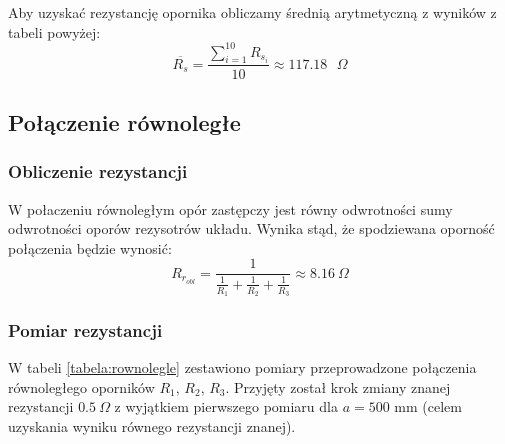 \documentclass[a4paper,12pts]{article}
\begin{document}
\begin{table}[!h]
	\centering
	\caption{Wyniki pomiarów dla połączenia szeregowego}
	\label{tabela:szeregowe}
\end{table}

Aby uzyskać rezystancję opornika obliczamy średnią arytmetyczną z wyników z tabeli powyżej:
\begin{equation}
\overline{R_{s}} = \frac{\sum_{i = 1}^{10} R_{{s}_i}}{10} \approx 117.18 \textrm{ $\Omega$}
\end{equation}


\subsection{Połączenie równoległe}
\subsubsection{Obliczenie rezystancji}
W połaczeniu równoległym opór zastępczy jest równy odwrotności sumy odwrotności oporów rezysotrów układu. Wynika stąd, że spodziewana oporność połączenia będzie wynosić:
\begin{equation}
R_{r_{obl}} = \frac{1}{\frac{1}{R_1} + \frac{1}{R_2} + \frac{1}{R_3}} \approx 8.16~\Omega 
\end{equation}

\subsubsection{Pomiar rezystancji}
W tabeli \ref{tabela:rownolegle} zestawiono pomiary przeprowadzone połączenia równoległego oporników $R_1$, $R_2$, $R_3$. Przyjęty został krok zmiany znanej rezystancji $0.5 ~\Omega$ z wyjątkiem pierwszego pomiaru dla $a = 500$ mm (celem uzyskania wyniku równego rezystancji znanej).
\end{document}
